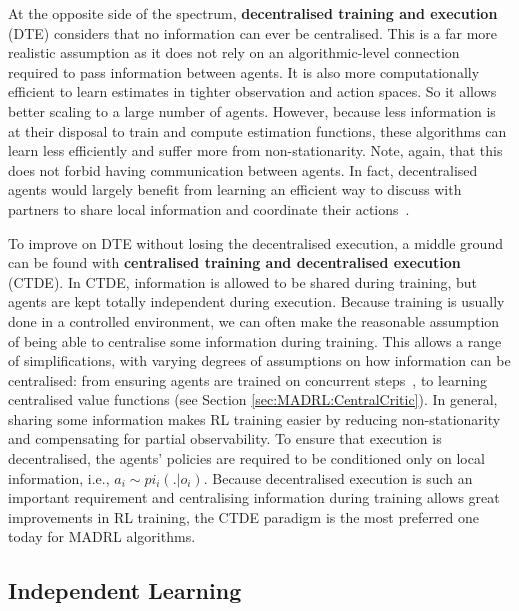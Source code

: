 At the opposite side of the spectrum, \textbf{decentralised training and execution} (DTE) considers that no information can ever be centralised. 
This is a far more realistic assumption as it does not rely on an algorithmic-level connection required to pass information between agents. 
It is also more computationally efficient to learn estimates in tighter observation and action spaces. So it allows better scaling to a large number of agents. 
However, because less information is at their disposal to train and compute estimation functions, these algorithms can learn less efficiently and suffer more from non-stationarity. 
Note, again, that this does not forbid having communication between agents. In fact, decentralised agents would largely benefit from learning an efficient way to discuss with partners to share local information and coordinate their actions~\citep{Cao2018_Negotiation}.

To improve on DTE without losing the decentralised execution, a middle ground can be found with \textbf{centralised training and decentralised execution} (CTDE). In CTDE, information is allowed to be shared during training, but agents are kept totally independent during execution. Because training is usually done in a controlled environment, we can often make the reasonable assumption of being able to centralise some information during training. 
This allows a range of simplifications, with varying degrees of assumptions on how information can be centralised: from ensuring agents are trained on concurrent steps~\citep{Omidshafiei2017_DecentrMultiTask}, to learning centralised value functions (see Section \ref{sec:MADRL:CentralCritic}). In general, sharing some information makes RL training easier by reducing non-stationarity and compensating for partial observability. To ensure that execution is decentralised, the agents' policies are required to be conditioned only on local information, i.e., $a_i\sim pi_i(.|o_i)$. Because decentralised execution is such an important requirement and centralising information during training allows great improvements in RL training, the CTDE paradigm is the most preferred one today for MADRL algorithms.




\subsection{Independent Learning}\label{sec:MADRL:IL}

